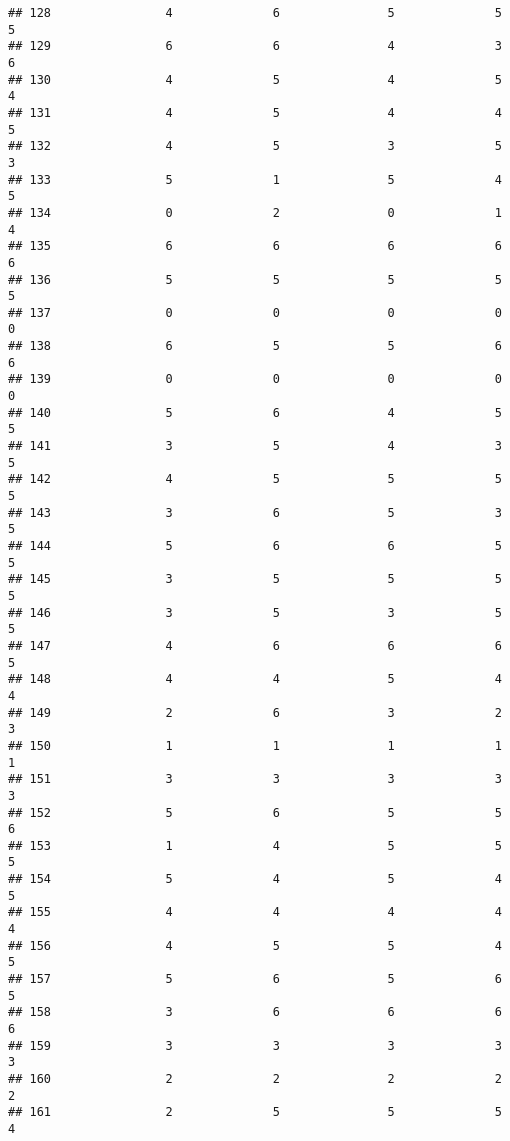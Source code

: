 \documentclass[
]{article}
\begin{document}
\begin{verbatim}
## 128                4              6               5              5       5
## 129                6              6               4              3       6
## 130                4              5               4              5       4
## 131                4              5               4              4       5
## 132                4              5               3              5       3
## 133                5              1               5              4       5
## 134                0              2               0              1       4
## 135                6              6               6              6       6
## 136                5              5               5              5       5
## 137                0              0               0              0       0
## 138                6              5               5              6       6
## 139                0              0               0              0       0
## 140                5              6               4              5       5
## 141                3              5               4              3       5
## 142                4              5               5              5       5
## 143                3              6               5              3       5
## 144                5              6               6              5       5
## 145                3              5               5              5       5
## 146                3              5               3              5       5
## 147                4              6               6              6       5
## 148                4              4               5              4       4
## 149                2              6               3              2       3
## 150                1              1               1              1       1
## 151                3              3               3              3       3
## 152                5              6               5              5       6
## 153                1              4               5              5       5
## 154                5              4               5              4       5
## 155                4              4               4              4       4
## 156                4              5               5              4       5
## 157                5              6               5              6       5
## 158                3              6               6              6       6
## 159                3              3               3              3       3
## 160                2              2               2              2       2
## 161                2              5               5              5       4

\end{verbatim}
\end{document}
